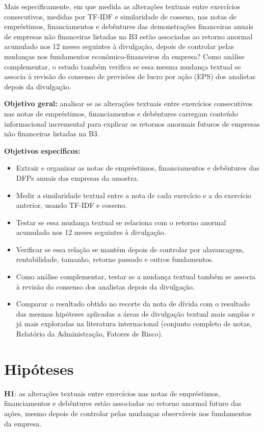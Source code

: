 \documentclass[a4paper,12pt]{report}
\begin{document}
Mais especificamente, em que medida as alterações textuais entre exercícios consecutivos, medidas por TF-IDF e similaridade de cosseno, nas notas de empréstimos, financiamentos e debêntures das demonstrações financeiras anuais de empresas não financeiras listadas na B3 estão associadas ao retorno anormal acumulado nos 12 meses seguintes à divulgação, depois de controlar pelas mudanças nos fundamentos econômico-financeiros da empresa? Como análise complementar, o estudo também verifica se essa mesma mudança textual se associa à revisão do consenso de previsões de lucro por ação (EPS) dos analistas depois da divulgação.

\textbf{Objetivo geral:} analisar se as alterações textuais entre exercícios consecutivos nas notas de empréstimos, financiamentos e debêntures carregam conteúdo informacional incremental para explicar os retornos anormais futuros de empresas não financeiras listadas na B3.

\textbf{Objetivos específicos:}
\begin{itemize}
    \item Extrair e organizar as notas de empréstimos, financiamentos e debêntures das DFPs anuais das empresas da amostra.
    \item Medir a similaridade textual entre a nota de cada exercício e a do exercício anterior, usando TF-IDF e cosseno.
    \item Testar se essa mudança textual se relaciona com o retorno anormal acumulado nos 12 meses seguintes à divulgação.
    \item Verificar se essa relação se mantém depois de controlar por alavancagem, rentabilidade, tamanho, retorno passado e outros fundamentos.
    \item Como análise complementar, testar se a mudança textual também se associa à revisão do consenso dos analistas depois da divulgação.
    \item Comparar o resultado obtido no recorte da nota de dívida com o resultado das mesmas hipóteses aplicadas a áreas de divulgação textual mais amplas e já mais exploradas na literatura internacional (conjunto completo de notas, Relatório da Administração, Fatores de Risco).
\end{itemize}

\section{Hipóteses}
\label{sec:hipoteses}

\textbf{H1}: as alterações textuais entre exercícios nas notas de empréstimos, financiamentos e debêntures estão associadas ao retorno anormal futuro das ações, mesmo depois de controlar pelas mudanças observáveis nos fundamentos da empresa.
\end{document}

